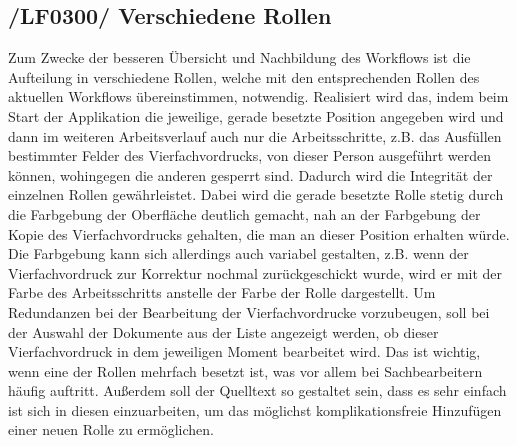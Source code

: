 \subsection{/LF0300/ Verschiedene Rollen}
Zum Zwecke der besseren Übersicht und Nachbildung des Workflows ist die Aufteilung in verschiedene Rollen, welche mit den entsprechenden Rollen des aktuellen Workflows übereinstimmen, notwendig. Realisiert wird das, indem beim Start der Applikation die jeweilige, gerade besetzte Position angegeben wird und dann im weiteren Arbeitsverlauf auch nur die Arbeitsschritte, z.B. das Ausfüllen bestimmter Felder des Vierfachvordrucks, von dieser Person ausgeführt werden können, wohingegen die anderen gesperrt sind. Dadurch wird die Integrität der einzelnen Rollen gewährleistet. Dabei wird die gerade besetzte Rolle stetig durch die Farbgebung der Oberfläche deutlich gemacht, nah an der Farbgebung der Kopie des Vierfachvordrucks gehalten, die man an dieser Position erhalten würde. Die Farbgebung kann sich allerdings auch variabel gestalten, z.B. wenn der Vierfachvordruck zur Korrektur nochmal zurückgeschickt wurde, wird er mit der Farbe des Arbeitsschritts anstelle der Farbe der Rolle dargestellt. Um Redundanzen bei der Bearbeitung der Vierfachvordrucke vorzubeugen, soll bei der Auswahl der Dokumente aus der Liste angezeigt werden, ob dieser Vierfachvordruck in dem jeweiligen Moment bearbeitet wird. Das ist wichtig, wenn eine der Rollen mehrfach besetzt ist, was vor allem bei Sachbearbeitern häufig auftritt. Außerdem soll der Quelltext so gestaltet sein, dass es sehr einfach ist sich in diesen einzuarbeiten, um das möglichst komplikationsfreie Hinzufügen einer neuen Rolle zu ermöglichen.